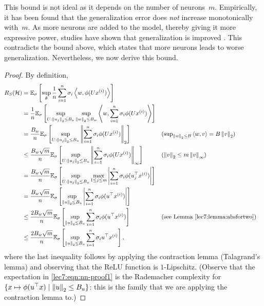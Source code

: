 This bound is not ideal as it depends on the number of neurons~$m$. Empirically, it has been found that the generalization error does \emph{not} increase monotonically with~$m$. As more neurons are added to the model, thereby giving it more expressive power, studies have shown that generalization is improved \cite{belkin2019}. This contradicts the bound above, which states that more neurons leads to worse generalization. Nevertheless, we now derive this bound.

\begin{proof}
    By definition,
    \begin{align}
        R_S(\mathcal{H}) 
        &= \mathbb{E}_\sigma\left[ \sup_\theta \frac{1}{n} \sum_{i=1}^n \sigma_i \left\langle w,\phi(Ux^{(i)})\right\rangle \right]
        \\&= \frac{1}{n} \mathbb{E}_\sigma\left[ \sup_{U : \left\|u_j\right\|_2 \leq B_u} \sup_{\left\|w\right\|_2 \leq B_w} \left\langle w,\sum_{i=1}^n \sigma_i \phi(Ux^{(i)})\right\rangle \right]
        \\&= \frac{B_w}{n}\mathbb{E}_\sigma\left[ \sup_{U : \left\|u_j\right\|_2 \leq B_u} \left\| \sum_{i=1}^n \sigma_i \phi(Ux^{(i)})\right\|_2 \right]
            &&\text{($\textstyle\sup_{\left\|w\right\|_2\leq B}\left\langle w,v\right\rangle = B\left\|v\right\|_2$)}
        \\&\leq \frac{B_w\sqrt{m}}{n}\mathbb{E}_\sigma\left[ \sup_{U : \left\|u_j\right\|_2 \leq B_u} \left\| \sum_{i=1}^n \sigma_i \phi(Ux^{(i)})\right\|_\infty \right]
            &&\text{($\left\|v\right\|_2 \leq m\left\|v\right\|_\infty$)}
        \\&= \frac{B_w\sqrt{m}}{n}\mathbb{E}_\sigma\left[ \sup_{U : \left\|u_j\right\|_2 \leq B_u} \max_{1\leq j\leq m} \left\lvert \sum_{i=1}^n \sigma_i \phi(u_j^\top x^{(i)})\right\rvert \right] 
        \\&= \frac{B_w\sqrt{m}}{n}\mathbb{E}_\sigma\left[ \sup_{\left\|u\right\|_2 \leq B_u} \left\lvert \sum_{i=1}^n \sigma_i \phi(u^\top x^{(i)})\right\rvert \right]
        \\&\leq \frac{2B_w\sqrt{m}}{n}\mathbb{E}_\sigma\left[ \sup_{\left\|u\right\|_2 \leq B_u} \sum_{i=1}^n \sigma_i \phi(u^\top x^{(i)}) \right]
            &&\text{(see Lemma \ref{lec7:lemma:absfortwo})} \label{lec7:eqn:nn-proof1}
        \\&\leq \frac{2B_w\sqrt{m}}{n}\mathbb{E}_\sigma\left[ \sup_{\left\|u\right\|_2 \leq B_u} \sum_{i=1}^n \sigma_i u^\top x^{(i)} \right], \label{lec7:eqn:nn-proof2}
    \end{align}
    where the last inequality follows by applying the contraction lemma (Talagrand's lemma) and observing that the ReLU function is $1$-Lipschitz. (Observe that the expectation in \eqref{lec7:eqn:nn-proof1} is the Rademacher complexity for $\{ x \mapsto \phi(u^\top x) \mid \left\|u\right\|_2 \leq B_u \}$: this is the family that we are applying the contraction lemma to.)
    

\end{proof}
